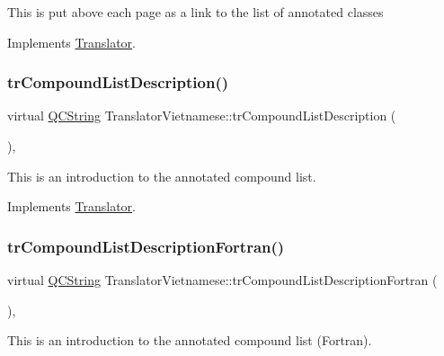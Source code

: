 This is put above each page as a link to the list of annotated classes 

Implements \mbox{\hyperlink{class_translator}{Translator}}.

\mbox{\label{class_translator_vietnamese_a717ba281f39200ddaafbdc960d9be0e4}} 
\subsubsection{\texorpdfstring{trCompoundListDescription()}{trCompoundListDescription()}}
{\footnotesize\ttfamily virtual \mbox{\hyperlink{class_q_c_string}{Q\+C\+String}} Translator\+Vietnamese\+::tr\+Compound\+List\+Description (\begin{DoxyParamCaption}{ }\end{DoxyParamCaption})\hspace{0.3cm}{\ttfamily [inline]}, {\ttfamily [virtual]}}

This is an introduction to the annotated compound list. 

Implements \mbox{\hyperlink{class_translator}{Translator}}.

\mbox{\label{class_translator_vietnamese_a3a3ae7bbb099fc4a882b6a311525a22b}} 
\subsubsection{\texorpdfstring{trCompoundListDescriptionFortran()}{trCompoundListDescriptionFortran()}}
{\footnotesize\ttfamily virtual \mbox{\hyperlink{class_q_c_string}{Q\+C\+String}} Translator\+Vietnamese\+::tr\+Compound\+List\+Description\+Fortran (\begin{DoxyParamCaption}{ }\end{DoxyParamCaption})\hspace{0.3cm}{\ttfamily [inline]}, {\ttfamily [virtual]}}

This is an introduction to the annotated compound list (Fortran). 

